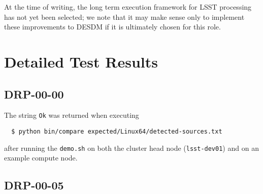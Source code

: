\documentclass[DM,lsstdraft,STR,toc]{lsstdoc}
\begin{document}
At the time of writing, the long term execution framework for LSST processing has not yet been selected; we note that it may make sense only to implement these improvements to DESDM if it is ultimately chosen for this role.

\newpage

\section{Detailed Test Results}
\label{sect:detailed}

\subsection{DRP-00-00}

The string \texttt{Ok} was returned when executing

\begin{verbatim}
  $ python bin/compare expected/Linux64/detected-sources.txt
\end{verbatim}

after running the \texttt{demo.sh} on both the cluster head node (\texttt{lsst-dev01}) and on an example compute node.


\subsection{DRP-00-05}
\end{document}
